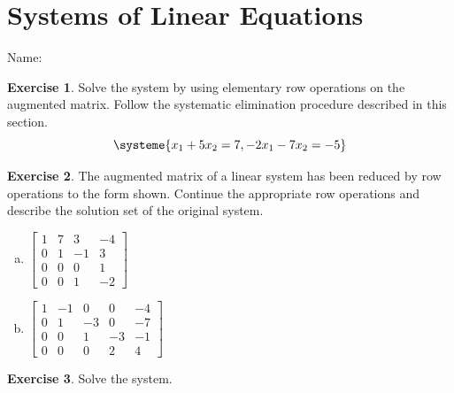 \documentclass[10pt]{book}
\theoremstyle{definition}
\newtheorem{exercise}{Exercise}[section]
\newcommand{\name}[1][2.5in]{\vspace{-2.3em}\hfill Name: \underline{\hspace{#1}}}
\begin{document}

\setcounter{chapter}{1}
\setcounter{section}{0}

\section{Systems of Linear Equations}
\name


\begin{exercise} %
	Solve the system by using elementary row operations on the augmented matrix. Follow the systematic elimination procedure described in this section.
	\[
	\systeme{
		x_1	+ 5x_2 =  7,
		-2x_1	- 7x_2 = -5}
	\]
\end{exercise}
\vfill


\begin{exercise} %
	The augmented matrix of a linear system has been reduced by row operations to the form shown. Continue the appropriate row operations and describe the solution set of the original system.
	\begin{multicols}{2}
		\begin{enumerate}[(a)]
			\item 
			$\begin{bmatrix}
			1 & 7 &  3 & -4 \\
			0 & 1 & -1 &  3 \\
			0 & 0 &  0 &  1 \\
			0 & 0 &  1 & -2
			\end{bmatrix}$
			\item
			$\begin{bmatrix}
			1 & -1 &  0 &  0 & -4 \\
			0 &  1 & -3 &  0 & -7 \\
			0 &  0 &  1 & -3 & -1 \\
			0 &  0 &  0 &  2 &  4
			\end{bmatrix}$
		\end{enumerate}
	\end{multicols}
\end{exercise}
\vfill


\newpage


\begin{exercise} %
	Solve the system. \\
	
\end{exercise}
\vfill
\end{document}
